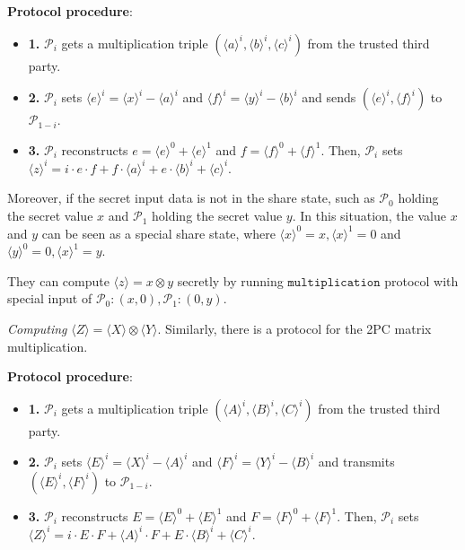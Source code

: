 \documentclass[letterpaper]{article} %
\begin{document}
    \textbf{Protocol procedure}:
    \begin{itemize}
        \item \textbf{1.} $\mathcal{P}_{i}$ gets a multiplication triple
        $(\langle a\rangle ^{i},\langle b\rangle ^{i},\langle c\rangle ^{i})$ from the trusted third party.
        \item \textbf{2.} $\mathcal{P}_{i}$ sets $\langle e\rangle ^{i}=\langle x\rangle ^{i}-\langle a\rangle ^{i}$ and $\langle f\rangle ^{i}=\langle y\rangle ^{i}-\langle b\rangle ^{i}$
        and sends $(\langle e\rangle ^{i},\langle f\rangle ^{i})$ to $\mathcal{P}_{1-i}$.
        \item \textbf{3.} $\mathcal{P}_{i}$ reconstructs $e = \langle e\rangle ^{0}+\langle e\rangle ^{1}$ and $f = \langle f\rangle ^{0}+\langle f\rangle ^{1}$.
        Then, $\mathcal{P}_{i}$ sets $\langle z\rangle^{i}=i\cdot e \cdot f + f\cdot \langle a\rangle^{i}+e \cdot \langle b\rangle^{i} + \langle c\rangle^{i}$.

    \end{itemize}

    Moreover, if the secret input data is not in the share state,
    such as $\mathcal{P}_{0}$ holding the secret value $x$
    and $\mathcal{P}_{1}$ holding the secret value $y$.
    In this situation, the value $x$ and $y$ can be
    seen as a special share state, where
    $\langle x\rangle ^{0}=x,\langle x\rangle ^{1}=0$ and
    $\langle y\rangle ^{0}=0,\langle x\rangle ^{1}=y$.

    They can compute $\langle z\rangle=x\otimes y$ secretly
    by running $\mathtt{multiplication}$ protocol with special input of
    $\mathcal{P}_{0}:(x,0),\mathcal{P}_{1}:(0,y)$.

    \emph{Computing} $ \langle Z\rangle  = \langle X\rangle  \otimes \langle Y\rangle$.
    Similarly, there is a protocol for the 2PC matrix multiplication.

    \textbf{Protocol procedure}:
    \begin{itemize}
        \item \textbf{1.} $\mathcal{P}_{i}$ gets a multiplication triple
        $(\langle A\rangle ^{i},\langle B\rangle ^{i},\langle C\rangle ^{i})$ from the trusted third party.
        \item \textbf{2.} $\mathcal{P}_{i}$ sets $\langle E\rangle ^{i}=\langle X\rangle ^{i}-\langle A\rangle ^{i}$ and $\langle F\rangle ^{i}=\langle Y\rangle ^{i}-\langle B\rangle ^{i}$
        and transmits $(\langle E\rangle ^{i},\langle F\rangle ^{i})$ to $\mathcal{P}_{1-i}$.
        \item \textbf{3.} $\mathcal{P}_{i}$ reconstructs $E = \langle E\rangle ^{0}+\langle E\rangle ^{1}$ and $F = \langle F\rangle ^{0}+\langle F\rangle ^{1}$.
        Then, $\mathcal{P}_{i}$ sets $\langle Z\rangle^{i}=i\cdot E \cdot F + \langle A\rangle^{i} \cdot F + E \cdot \langle B\rangle^{i} + \langle C\rangle^{i}$.

    \end{itemize}
\end{document}
